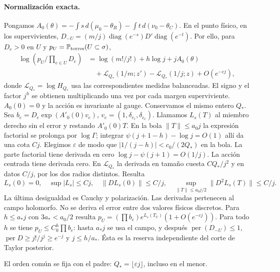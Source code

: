 \paragraph{Normalización exacta.}
Pongamos $A_0(\theta)=-\int s\,d(\mu_0-\theta_R)-\int t\,d(\nu_0-\theta_C)$.
En el punto físico, en los supervivientes,
$D_{-U}=(m/j)\operatorname{diag}(e^{-s})D'\operatorname{diag}(e^{-t})$.
Por ello, para $D_e>0$ en $U$ y $p_U=\mathbb P_{\rm torres}(U\subset\sigma)$,
\begin{align*}
 \log(p_U/\textstyle\prod_{e\in U}D_e)
 &=\log(m!/j!)+h\log j+j A_0(\theta)\\
 &\quad+\mathcal L_{Q_*}(1/m;z')-\mathcal L_{Q_*}(1/j;z)+O(e^{-cj}),
\end{align*}
donde $\mathcal L_{Q_*}=\log H_{Q_*}$ usa las correspondientes medidas balanceadas.
El signo y el factor $j^h$ se obtienen multiplicando una vez por cada margen superviviente.
$A_0(0)=0$ y la acción es invariante al gauge. Conservamos el mismo entero $Q_*$.
Sea $b_e=D_e\exp(A'_0(0)v_e)$, $v_e=(1,\delta_{r_e},\delta_{c_e})$.
Llamamos $L_s(T)$ al miembro derecho sin el error y restando $A'_0(0)T$.
En la bola $\|T\|\le a_0 j$ la expresión factorial se prolonga por $\log\Gamma$;
integrar $\psi(j+1-h)-\log j=O(1)$ allí da una cota $Cj$.
Elegimos $\varepsilon$ de modo que $|1/(j-h)|<c_0/(2Q_*)$ en la bola.
La parte factorial tiene derivada en cero $\log j-\psi(j+1)=O(1/j)$.
La acción centrada tiene derivada cero. En $\mathcal L_{Q_*}$ la derivada en tamaño
cuesta $CQ_*/j^2$ y en datos $C/j$, por los dos radios distintos. Resulta
\[
 L_s(0)=0,\quad\sup|L_s|\le Cj,\quad
 \|DL_s(0)\|\le C/j,\quad \sup_{\|T\|\le a_0 j/2}\|D^2 L_s(T)\|\le C/j.
\]
La última desigualdad es Cauchy y polarización. Las derivadas pertenecen al campo
holomorfo. No se deriva el error entre dos valores físicos discretos.
Para $h\le a_* j$ con $3a_*<a_0/2$ resulta
$p_U=(\prod b_e)e^{L_s(T_U)}(1+O(e^{-cj}))$. Para todo $h$ se tiene
$p_U\le C_0^h\prod b_e$: hasta $a_* j$ se usa el campo, y después
$\operatorname{per}(D_{-U})\le1$, $\operatorname{per}D\ge j!/j^j\ge e^{-j}$
y $j\le h/a_*$. Ésta es la reserva independiente del corte de Taylor posterior.

El orden común se fija con el padre: $Q_*=\lfloor\varepsilon j\rfloor$, incluso en el menor.
